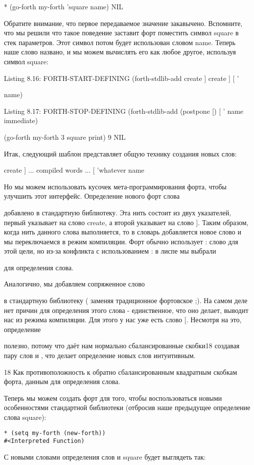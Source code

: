 * (go-forth my-forth
’square name)
NIL

Обратите внимание, что первое передаваемое значение закавычено. Вспомните, что мы решили что такое поведение заставит форт поместить символ square в стек параметров. Этот символ потом будет использован словом name. Теперь наше слово названо, и мы можем вычислять его как любое другое, используя символ square: 

Listing 8.16: FORTH-START-DEFINING
(forth-stdlib-add
create
] create ] [
’{ name)

Listing 8.17: FORTH-STOP-DEFINING
(forth-stdlib-add
{ (postpone [) [
’} name immediate)

(go-forth my-forth
3 square print)
9
NIL

Итак, следующий шаблон представляет общую технику создания новых слов:

create
] ... compiled words ... [
’whatever name

Но мы можем использовать кусочек мета-программирования форта, чтобы улучшить этот интерфейс. Определение  нового форт слова { добавлено в стандартную библиотеку. Эта нить состоит из двух указателей, первый указывает на слово create, а второй указывает на слово ]. Таким образом, когда нить данного слова выполняется, то в словарь добавляется новое слово и мы переключаемся в режим компиляции. Форт обычно использует : слово для этой цели, но из-за конфликта с использованием : в лиспе мы выбрали { для определения слова.

Аналогично, мы добавляем сопряженное слово } в стандартную библиотеку ( заменяя традиционное фортовское ;). На самом деле нет причин для определения этого слова - единственное, что оно делает, выводит нас из режима компиляции. Для этого у нас уже есть слово [. Несмотря на это, определение { полезно, потому что даёт нам нормально сбалансированные скобки18 создавая пару слов { и }, что делает определение новых слов интуитивным.

18 Как противоположность к обратно сбалансированным квадратным скобкам форта, данным для определения слова.

Теперь мы можем создать форт для того, чтобы воспользоваться новыми особенностями стандартной библиотеки (отбросив наше предыдущее определение слова square):

\begin{verbatim}
* (setq my-forth (new-forth))
#<Interpreted Function)
\end{verbatim}

С новыми словами определения слов { и } square будет выглядеть так:

}}}
